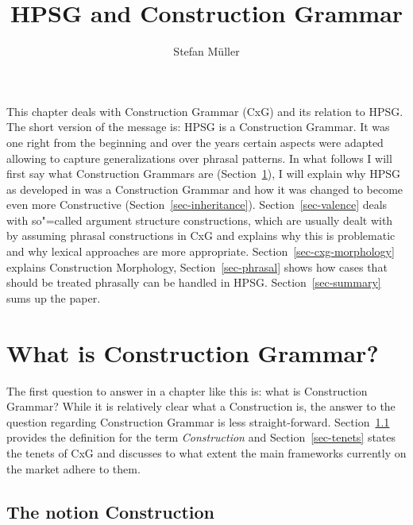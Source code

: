 \documentclass[output=paper]{langsci/langscibook}
\author{Stefan Müller\affiliation{Humboldt-Universität zu Berlin}}
\title{HPSG and Construction Grammar}
\begin{document}
\label{firstpage-cxg}

\noindent
This chapter deals with Construction Grammar (CxG) and its relation to HPSG. The short version of the
message is: HPSG is a Construction Grammar. It was one right from the beginning and over the years
certain aspects were adapted allowing to capture generalizations over phrasal patterns. In what
follows I will first say what Construction Grammars are (Section~\ref{sec-cxg}), I will explain why
HPSG as developed in  was a Construction Grammar and how it was changed to become even
more Constructive (Section~\ref{sec-inheritance}). Section~\ref{sec-valence} deals with so"=called
argument structure constructions, which are usually dealt with by assuming phrasal constructions in CxG and explains why this is
problematic and why lexical approaches are more appropriate. Section~\ref{sec-cxg-morphology} explains
Construction Morphology, Section~\ref{sec-phrasal} shows how cases that should be treated phrasally
can be handled in HPSG. Section~\ref{sec-summary} sums up the paper.

\section{What is Construction Grammar?}
\label{sec-cxg}

The first question to answer in a chapter like this is: what is Construction Grammar? While it is
relatively clear what a Construction is, the answer to the question regarding Construction Grammar
is less straight-forward. Section~\ref{sec-def-construction} provides the definition for the term
\emph{Construction} and Section~\ref{sec-tenets} states the tenets of CxG and discusses to what
extent the main frameworks currently on the market adhere to them.

\subsection{The notion Construction}
\label{sec-def-construction}
\end{document}
